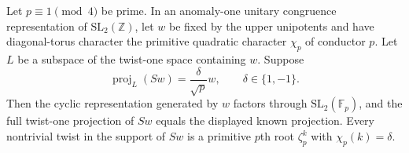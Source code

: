 \begin{proposition}
\label{prop:prime-quadratic-saturation}
Let $p\equiv1\pmod4$ be prime.  In an anomaly-one unitary congruence
representation of $\mathrm{SL}_2(\mathbb Z)$, let $w$ be fixed by the
upper unipotents and have diagonal-torus character the primitive
quadratic character $\chi_p$ of conductor $p$.  Let $L$ be a subspace
of the twist-one space containing $w$.  Suppose
\[
 \operatorname{proj}_L(Sw)=\frac{\delta}{\sqrt p}w,
 \qquad \delta\in\{1,-1\}.
\]
Then the cyclic representation generated by $w$ factors through
$\mathrm{SL}_2(\mathbb F_p)$, and the full twist-one projection of
$Sw$ equals the displayed known projection.  Every nontrivial twist
in the support of $Sw$ is a primitive $p$th root $\zeta_p^k$ with
$\chi_p(k)=\delta$.
\end{proposition}

